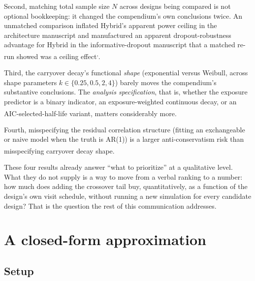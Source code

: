 \documentclass[
  11pt,
]{article}
\begin{document}
Second, matching total sample size \(N\) across designs being compared
is not optional bookkeeping: it changed the compendium's own
conclusions twice. An unmatched comparison inflated Hybrid's apparent
power ceiling in the architecture manuscript and manufactured an
apparent dropout-robustness advantage for Hybrid in the
informative-dropout manuscript that a matched re-run showed was a
ceiling effect\textsuperscript{,}.

Third, the carryover decay's functional \emph{shape} (exponential
versus Weibull, across shape parameters \(k \in \{0.25, 0.5, 2,
4\}\)) barely moves the compendium's substantive conclusions. The
\emph{analysis specification}, that is, whether the exposure predictor
is a binary indicator, an exposure-weighted continuous decay, or
an AIC-selected-half-life variant, matters considerably more\textsuperscript{}.

Fourth, misspecifying the residual correlation structure (fitting an
exchangeable or naive model when the truth is AR(1)) is a larger
anti-conservatism risk than misspecifying carryover decay shape\textsuperscript{}.

These four results already answer ``what to prioritize'' at a
qualitative level. What they do not supply is a way to move from a
verbal ranking to a number: how much does adding the crossover tail
buy, quantitatively, as a function of the design's own visit
schedule, without running a new simulation for every candidate
design? That is the question the rest of this communication addresses.

\section{A closed-form approximation}\label{a-closed-form-approximation}

\subsection{Setup}\label{setup}
\end{document}
